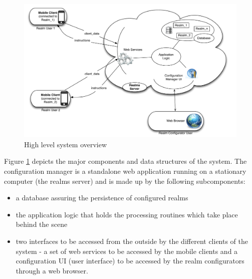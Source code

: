 \begin{figure}
	\centering
	\includegraphics[width=1.0\linewidth]{fig/realms_high_lvl}
	\caption{High level system overview}
	\label{fig.design.high_lvl}
\end{figure}
\noindent Figure \ref{fig.design.high_lvl} depicts the major components and data structures of the system. The configuration manager is a standalone web application running on a stationary computer (the realms server) and is made up by the following subcomponents:
\begin{itemize}
	\item a database assuring the persistence of configured realms
	\item the application logic that holds the processing routines which take place behind the scene
	\item two interfaces to be accessed from the outside by the different clients of the system - a set of web services to be accessed by the mobile clients and a configuration UI (user interface) to be accessed by the realm configurators through a web browser. 
\end{itemize}

